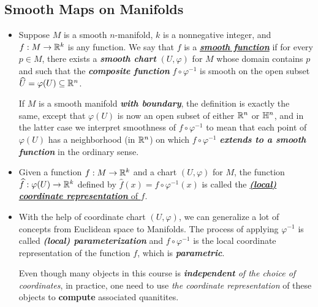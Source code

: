 \documentclass[11pt]{article}
\begin{document}
\subsection{Smooth Maps on Manifolds}
\begin{itemize}
\item 
\begin{definition}
Suppose $M$ is a smooth $n$-manifold, $k$ is a nonnegative integer, and $f: M \rightarrow {\mathbb R}^k$ is any function. We say that $f$ is a \underline{\emph{\textbf{smooth function}}} if for every $p \in M$, there exists a \emph{\textbf{smooth chart}} $(U, \varphi)$ for $M$ whose domain contains $p$ and such that the \emph{\textbf{composite function}} $f \circ \varphi^{-1}$ is smooth on the open subset $\widehat{U} = \varphi(U) \subseteq {\mathbb R}^n$.

If $M$ is a smooth manifold \emph{\textbf{with boundary}}, the definition is exactly the same, except that $\varphi(U)$ is now an open subset of either 
${\mathbb R}^n$ or ${\mathbb H}^n$, and in the latter case we interpret smoothness of $f \circ \varphi^{-1}$ to mean that each point of $\varphi(U)$ has a neighborhood (in ${\mathbb R}^n$) on which $f \circ \varphi^{-1}$ \emph{\textbf{extends to a smooth function}} in the ordinary sense.
\end{definition}

\item \begin{definition}
Given a function $f: M \rightarrow {\mathbb R}^k$ and a chart $(U, \varphi)$ for $M$, the function $\widehat{f}: \varphi(U) \rightarrow {\mathbb R}^k$ defined by $\widehat{f}(x) = f \circ \varphi^{-1}(x)$ is called the \underline{\emph{\textbf{(local) coordinate representation}} of $f$}. 
\end{definition}

\item \begin{remark}
With the help of coordinate chart $(U, \varphi)$, we can generalize a lot of concepts from Euclidean space to Manifolds. The process of applying $\varphi^{-1}$ is called  \emph{\textbf{(local) parameterization}} and $f \circ \varphi^{-1}$ is the local coordinate representation of the function $f$, which is \emph{\textbf{parametric}}. 

Even though  many objects in this course is \emph{\textbf{independent} of the choice of coordinates},  in practice, one need to use \emph{the coordinate representation} of these objects to \textbf{compute} associated quanitites.
\end{remark}


\end{itemize}
\end{document}
